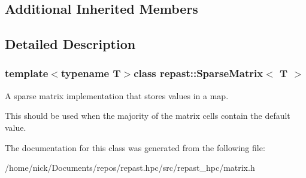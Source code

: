 \subsection*{Additional Inherited Members}


\subsection{Detailed Description}
\subsubsection*{template$<$typename T$>$class repast\-::\-Sparse\-Matrix$<$ T $>$}

A sparse matrix implementation that stores values in a map. 

This should be used when the majority of the matrix cells contain the default value. 

The documentation for this class was generated from the following file\-:\begin{DoxyCompactItemize}
\item 
/home/nick/\-Documents/repos/repast.\-hpc/src/repast\-\_\-hpc/matrix.\-h\end{DoxyCompactItemize}
